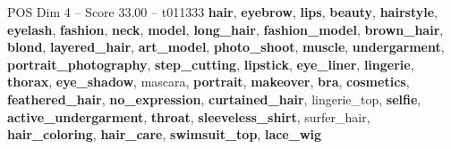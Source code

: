 \begin{textsample}{POS Dim 4 – Score 33.00 – t011333}  \label{ex:f4_pos_002}
\textbf{hair}, \textbf{eyebrow}, \textbf{lips}, \textbf{beauty}, \textbf{hairstyle}, \textbf{eyelash}, \textbf{fashion}, \textbf{neck}, \textbf{model}, \textbf{long\_hair}, \textbf{fashion\_model}, \textbf{brown\_hair}, \textbf{blond}, \textbf{layered\_hair}, \textbf{art\_model}, \textbf{photo\_shoot}, \textbf{muscle}, \textbf{undergarment}, \textbf{portrait\_photography}, \textbf{step\_cutting}, \textbf{lipstick}, \textbf{eye\_liner}, \textbf{lingerie}, \textbf{thorax}, \textbf{eye\_shadow}, mascara, \textbf{portrait}, \textbf{makeover}, \textbf{bra}, \textbf{cosmetics}, \textbf{feathered\_hair}, \textbf{no\_expression}, \textbf{curtained\_hair}, lingerie\_top, \textbf{selfie}, \textbf{active\_undergarment}, \textbf{throat}, \textbf{sleeveless\_shirt}, surfer\_hair, \textbf{hair\_coloring}, \textbf{hair\_care}, \textbf{swimsuit\_top}, \textbf{lace\_wig}

\end{textsample}
